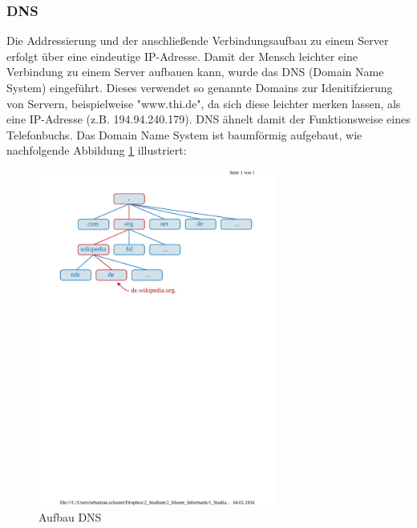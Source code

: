 \subsubsection*{DNS}
Die Addressierung und der anschließende Verbindungsaufbau zu einem Server erfolgt über eine eindeutige IP-Adresse. Damit der Mensch leichter eine Verbindung zu einem Server aufbauen kann,
wurde das DNS (Domain Name System) eingeführt. Dieses verwendet so genannte Domains zur Idenitifzierung von Servern, beispielweise "www.thi.de", da sich diese leichter merken lassen, als
eine IP-Adresse (z.B. 194.94.240.179). DNS ähnelt damit der Funktionsweise eines Telefonbuchs.
Das Domain Name System ist baumförmig aufgebaut, wie nachfolgende Abbildung \ref{fig:dns} illustriert: \\
\begin{figure}[h!]
	\centering
	\includegraphics[width=0.7\textwidth]{bilder/dns.pdf}
	\caption{Aufbau DNS \cite{dnspicture}}
	\label{fig:dns}
\end{figure}



